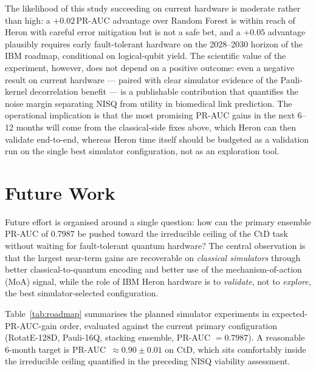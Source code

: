 \documentclass[twocolumn,10pt]{article}
\begin{document}
The likelihood of this study succeeding on current hardware is moderate rather than high: a $+0.02$\,PR-AUC advantage over Random Forest is within reach of Heron with careful error mitigation but is not a safe bet, and a $+0.05$ advantage plausibly requires early fault-tolerant hardware on the 2028--2030 horizon of the IBM roadmap, conditional on logical-qubit yield. The scientific value of the experiment, however, does not depend on a positive outcome: even a negative result on current hardware --- paired with clear simulator evidence of the Pauli-kernel decorrelation benefit --- is a publishable contribution that quantifies the noise margin separating NISQ from utility in biomedical link prediction. The operational implication is that the most promising PR-AUC gains in the next 6--12 months will come from the classical-side fixes above, which Heron can then validate end-to-end, whereas Heron time itself should be budgeted as a validation run on the single best simulator configuration, not as an exploration tool.

\section{Future Work}

Future effort is organised around a single question: how can the primary ensemble PR-AUC of 0.7987 be pushed toward the irreducible ceiling of the CtD task without waiting for fault-tolerant quantum hardware? The central observation is that the largest near-term gains are recoverable on \emph{classical simulators} through better classical-to-quantum encoding and better use of the mechanism-of-action (MoA) signal, while the role of IBM Heron hardware is to \emph{validate}, not to \emph{explore}, the best simulator-selected configuration.

Table~\ref{tab:roadmap} summarises the planned simulator experiments in expected-PR-AUC-gain order, evaluated against the current primary configuration (RotatE-128D, Pauli-16Q, stacking ensemble, PR-AUC $= 0.7987$). A reasonable 6-month target is PR-AUC~$\approx 0.90 \pm 0.01$ on CtD, which sits comfortably inside the irreducible ceiling quantified in the preceding NISQ viability assessment.
\end{document}
